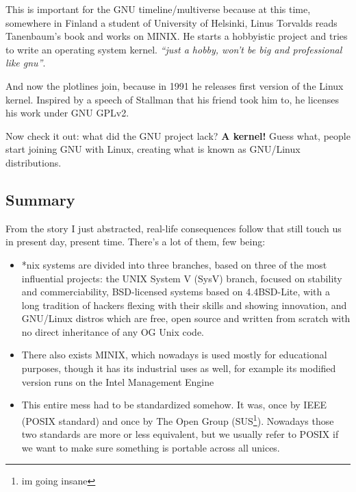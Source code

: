 \documentclass[../ops.tex]{subfiles}
\begin{document}
        This is important for the GNU timeline/multiverse because at this time,
        somewhere in Finland a student of University of Helsinki, Linus Torvalds
        reads Tanenbaum's book and works on MINIX. He starts a hobbyistic
        project and tries to write an operating system kernel. \emph{``just a
        hobby, won't be big and professional like gnu''}.

        And now the plotlines join, because in 1991 he releases first version of
        the Linux kernel. Inspired by a speech of Stallman that his friend took
        him to, he licenses his work under GNU GPLv2.

        Now check it out: what did the GNU project lack? {\bf A kernel!} Guess
        what, people start joining GNU with Linux, creating what is known as
        GNU/Linux distributions.

        \subsection{Summary}
        From the story I just abstracted, real-life consequences follow that
        still touch us in present day, present time. There's a lot of them, few
        being:
        \begin{itemize}
                \item *nix systems are divided into three branches, based on
                        three of the most influential projects: the UNIX System
                        V (SysV) branch, focused on stability and
                        commerciability, BSD-licensed systems based on
                        4.4BSD-Lite, with a long tradition of hackers flexing
                        with their skills and showing innovation, and GNU/Linux
                        distros which are free, open source and written from
                        scratch with no direct inheritance of any OG Unix code.
                \item There also exists MINIX, which nowadays is used mostly
                        for educational purposes, though it has its industrial
                        uses as well, for example its modified version runs on
                        the Intel Management Engine
                \item This entire mess had to be standardized somehow. It was,
                        once by IEEE (POSIX standard) and once by The Open Group
                        (SUS\footnote{im going insane}). Nowadays those two
                        standards are more or less equivalent, but we usually
                        refer to POSIX if we want to make sure something is
                        portable across all unices.
        \end{itemize}
\end{document}
